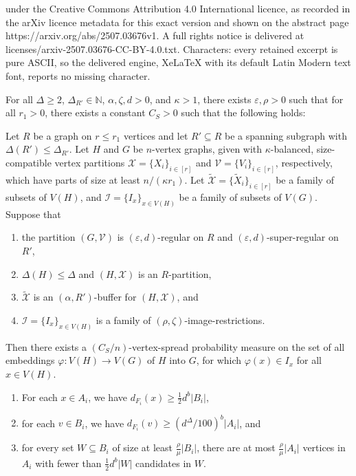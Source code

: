 \documentclass[10pt,a4paper]{amsart}
\let\tilde\widetilde
\newcommand{\eps}{\varepsilon}
\newcommand{\itmarab}[1]{\mbox{\rm 
({\it #1}\,\arabic{*}\hspace{0.05em})}}
\begin{document}
under the Creative Commons Attribution 4.0 International licence, as recorded in the arXiv licence metadata for this exact version and shown on the abstract page https://arxiv.org/abs/2507.03676v1. A full rights notice is delivered at licenses/arxiv-2507.03676-CC-BY-4.0.txt. Characters: every retained excerpt is pure ASCII, so the delivered engine, XeLaTeX with its default Latin Modern text font, reports no missing character.
\begin{theorem} \label{thm:spread_dense_blowup}
  For all $\Delta\ge 2$, $\Delta_{R'} \in \mathbb{N}$, $\alpha, \zeta, d>0$, and ${\kappa>1}$, there exists $\eps, \rho > 0$ such that for all $r_1 > 0$, there exists a constant $C_S > 0$ such that the following holds: 
  
  Let $R$ be a graph on $r\le r_1$ vertices and let $R'\subseteq R$ be a spanning subgraph with $\Delta(R')\leq \Delta_{R'}$. Let $H$ and $G$ be $n$-vertex graphs, given with $\kappa$-balanced, size-compatible vertex partitions $\mathcal{X}=\{X_i\}_{i\in[r]}$ and $\mathcal{V}=\{V_i\}_{i\in[r]}$, respectively, which have parts of size at
  least $n/(\kappa r_1)$. Let 
  $\tilde{\mathcal{X}}=\{\tilde{X}_i\}_{i\in[r]}$ be a family of subsets of $V(H)$, and $\mathcal{I} = \{I_x\}_{x \in V(H)}$ be a family of subsets of $V(G)$.  
  Suppose that
  \begin{enumerate}[label=\itmarab{BL}]
  \item \label{itm:SpBL1} the partition $(G,\mathcal{V})$ is $(\eps,d)$-regular on $R$ and $(\eps,d)$-super-regular on $R'$,
  \item \label{itm:SpBL2} $\Delta(H)\leq \Delta$ and $(H,\mathcal{X})$ is an $R$-partition,
  \item \label{itm:SpBL3} $\tilde{\mathcal{X}}$ is an $(\alpha,R')$-buffer for $(H,\mathcal{X})$, and
  \item \label{itm:SpBL4} $\mathcal{I} = \{I_x\}_{x \in V(H)}$ is a family of $(\rho, \zeta)$-image-restrictions. 
  \end{enumerate}

  Then there exists a $(C_S/n)$-vertex-spread probability measure on the set of all embeddings ${\varphi: V(H) \to V(G)}$ of $H$ into $G$, for which $\varphi(x) \in I_x$ for all $x \in V(H)$.
\end{theorem}

\begin{enumerate}[label=\itmarab{FB}]
    \item \label{itm:FB1} For each $x \in A_i$, we have $d_{F_i}(x) \geq  \frac{1}{2} d^b |B_i|$,
    \item \label{itm:FB2} for each $v \in B_i$, we have $d_{F_i}(v) \geq  (d^{\Delta}/100)^b |A_i|$, and
    \item \label{itm:FB3}for every set $W \subseteq B_i$ of size at least $\frac{\rho}{\mu}|B_i|$, there are at most $\frac{\rho}{\mu}|A_i|$ vertices in $A_i$ with fewer than $\frac{1}{2} d^b |W|$ candidates in $W$.
\end{enumerate}
\end{document}
